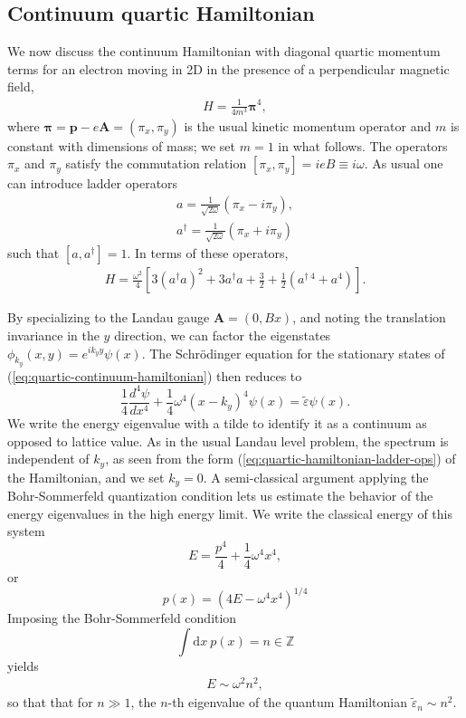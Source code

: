 \documentclass[aps,twocolumn,letterpaper,twoside,nobalancelastpage,groupedaddress,amsmath,amssymb,floatfix,citeautoscript]{revtex4-1}
\begin{document}
\subsection{Continuum quartic Hamiltonian}
\label{sec:continuum-hamiltonian}
We now discuss the continuum Hamiltonian with diagonal quartic momentum terms for an electron moving in 2D in the presence of a perpendicular magnetic field,
\begin{align}
\label{eq:quartic-continuum-hamiltonian}
H = \frac{1}{4m^3}\bm{\pi}^4,
\end{align}
where $\bm{\pi} = \mathbf{p}-e\mathbf{A} = (\pi_x,\pi_y)$  is the usual kinetic momentum operator and $m$ is constant with dimensions of mass; we set $m=1$ in what follows. The operators $\pi_x$ and $\pi_y$ satisfy the commutation relation $\left[\pi_x,\pi_y\right] = ieB \equiv i\omega$. As usual one can introduce ladder operators
\begin{align*}
a = \frac{1}{\sqrt{2\omega}}\left(\pi_x -i\pi_y\right),\\
a^{\dagger} = \frac{1}{\sqrt{2\omega}}\left(\pi_x + i \pi_y\right)
\end{align*}
such that $\left[a,a^{\dagger}\right]=1$. In terms of these operators,
\begin{align}
\label{eq:quartic-hamiltonian-ladder-ops}
H = \frac{\omega^2}{4}\left[3(a^{\dag}a)^2 + 3a^{\dag}a + \frac{3}{2} + \frac{1}{2}\left(a^{\dag~4} + a^4\right)\right].
\end{align}

By specializing to the Landau gauge $\mathbf{A} = (0,Bx)$, and noting the translation invariance in the $y$ direction, we can factor the eigenstates $\phi_{k_y}(x,y) = e^{ik_y y}\psi(x)$. The Schr{\"o}dinger equation for the stationary states of (\ref{eq:quartic-continuum-hamiltonian}) then reduces to
\[
\frac{1}{4}\frac{d^4\psi}{dx^4} + \frac{1}{4}\omega^4 \left(x-k_y\right)^4\psi(x) = \tilde{\varepsilon} \psi(x).
\]
We write the energy eigenvalue with a tilde to identify it as a continuum as opposed to lattice value. As in the usual Landau level problem, the spectrum is independent of $k_y$, as seen from the form (\ref{eq:quartic-hamiltonian-ladder-ops}) of the Hamiltonian, and we set $k_y=0$. A semi-classical argument applying the Bohr-Sommerfeld quantization condition lets us estimate the behavior of the energy eigenvalues in the high energy limit. We write the classical energy of this system
\[
E = \frac{p^4}{4} + \frac{1}{4}\omega^4 x^4,
\]
or
\[
p(x) = (4E-\omega^4 x^4)^{1/4}
\]
Imposing the Bohr-Sommerfeld condition
\[
\int \text{d}x~p(x) = n \in \mathbb{Z}
\]
yields
\begin{align*}
E \sim \omega^2 n^2,
\end{align*}
so that that for $n \gg 1$, the $n$-th eigenvalue of the quantum Hamiltonian $\tilde{\varepsilon}_n \sim n^2$.
\end{document}

